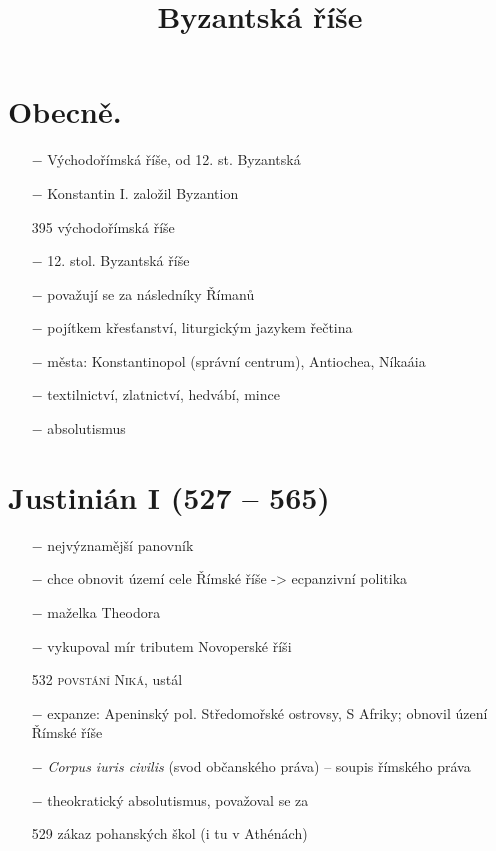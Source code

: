 \documentclass{article}
\title{\vspace{-2cm}Byzantská říše\vspace{-1.7cm}}
\date{}
\author{}
\begin{document}
\maketitle

\section*{Obecně.}
\begin{itemize}
    \vspace{-0.5em}
    \setlength\itemsep{0.15em}
    \item[$-$] Východořímská říše, od 12. st. Byzantská
    \item[$-$] Konstantin I. založil Byzantion
    \item[395] východořímská říše
    \item[$-$] 12. stol. Byzantská říše
    \item[$-$] považují se za následníky Římanů
    \item[$-$] pojítkem křesťanství, liturgickým jazykem řečtina
    \item[$-$] města: Konstantinopol (správní centrum), Antiochea, Níkaáia
    \item[$-$] textilnictví, zlatnictví, hedvábí, mince
    \item[$-$] absolutismus
\end{itemize}

\section*{Justinián I (527 -- 565)}
\begin{itemize}
    \vspace{-0.5em}
    \setlength\itemsep{0.15em}
    \item[$-$] nejvýznamější panovník
    \item[$-$] chce obnovit území cele Římské říše -> ecpanzivní politika
    \item[$-$] maželka Theodora
    \item[$-$] vykupoval mír tributem Novoperské říši
    \item[532] \textsc{povstání Niká}, ustál
    \item[$-$] expanze: Apeninský pol. Středomořské ostrovsy, S Afriky; obnovil úzení Římské říše
    \item[$-$] \textit{Corpus iuris civilis} (svod občanského práva) -- soupis římského práva
    \item[$-$] theokratický absolutismus, považoval se za 
    \item[529] zákaz pohanských škol (i tu v Athénách)  
\end{itemize}
\end{document}
